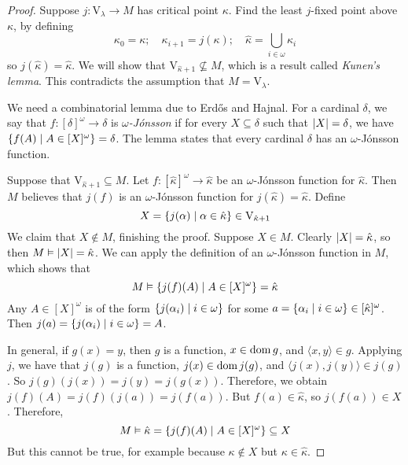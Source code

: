 \begin{proof}
    Suppose \( j : \mathrm{V}_\lambda \to M \) has critical point \( \kappa \).
    Find the least \( j \)-fixed point above \( \kappa \), by defining
    \[ \kappa_0 = \kappa;\quad \kappa_{i + 1} = j(\kappa);\quad \hat \kappa = \bigcup_{i \in \omega} \kappa_i \]
    so \( j(\hat \kappa) = \hat \kappa \).
    We will show that \( \mathrm{V}_{\hat\kappa + 1} \nsubseteq M \), which is a result called \emph{Kunen's lemma}.
    This contradicts the assumption that \( M = \mathrm{V}_\lambda \).

    We need a combinatorial lemma due to Erd\H{o}s and Hajnal.
    For a cardinal \( \delta \), we say that \( f : [\delta]^\omega \to \delta \) is \emph{\( \omega \)-J\'onsson} if for every \( X \subseteq \delta \) such that \( \abs{X} = \delta \), we have \( \qty{f(A) \mid A \in [X]^\omega} = \delta \).
    The lemma states that every cardinal \( \delta \) has an \( \omega \)-J\'onsson function.

    Suppose that \( \mathrm{V}_{\hat\kappa + 1} \subseteq M \).
    Let \( f : [\hat\kappa]^\omega \to \hat\kappa \) be an \( \omega \)-J\'onsson function for \( \hat\kappa \).
    Then \( M \) believes that \( j(f) \) is an \( \omega \)-J\'onsson function for \( j(\hat\kappa) = \hat\kappa \).
    Define
    \[ X = \qty{j(\alpha) \mid \alpha \in \hat\kappa} \in \mathrm{V}_{\hat\kappa + 1} \]
    We claim that \( X \notin M \), finishing the proof.
    Suppose \( X \in M \).
    Clearly \( \abs{X} = \hat\kappa \), so then \( M \vDash \abs{X} = \hat\kappa \).
    We can apply the definition of an \( \omega \)-J\'onsson function in \( M \), which shows that
    \[ M \vDash \qty{j(f)(A) \mid A \in [X]^\omega} = \hat\kappa \]
    Any \( A \in [X]^\omega \) is of the form \( \qty{j(\alpha_i) \mid i \in \omega} \) for some \( a = \qty{\alpha_i \mid i \in \omega} \in [\hat\kappa]^\omega \).
    Then \( j(a) = \qty{j(\alpha_i) \mid i \in \omega} = A \).

    In general, if \( g(x) = y \), then \( g \) is a function, \( x \in \operatorname{dom} g \), and \( \langle x, y \rangle \in g \).
    Applying \( j \), we have that \( j(g) \) is a function, \( j(x) \in \operatorname{dom} j(g) \), and \( \langle j(x), j(y) \rangle \in j(g) \).
    So \( j(g)(j(x)) = j(y) = j(g(x)) \).
    Therefore, we obtain \( j(f)(A) = j(f)(j(a)) = j(f(a)) \).
    But \( f(a) \in \hat\kappa \), so \( j(f(a)) \in X \).
    Therefore,
    \[ M \vDash \hat\kappa = \qty{j(f)(A) \mid A \in [X]^\omega} \subseteq X \]
    But this cannot be true, for example because \( \kappa \notin X \) but \( \kappa \in \hat\kappa \).
\end{proof}
